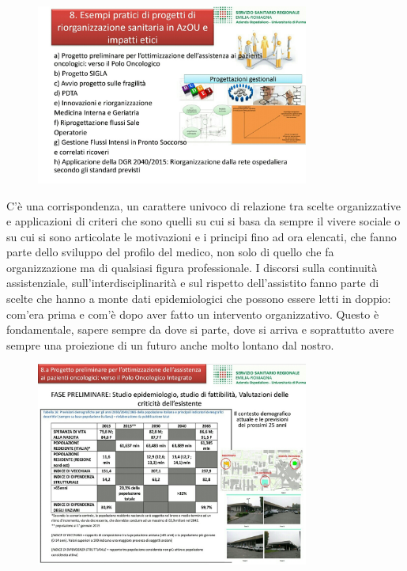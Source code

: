  \begin{figure}[!ht]
\centering
	\includegraphics[width=0.8\textwidth]{32/image23.jpeg}
	\end{figure}

C'è una corrispondenza, un carattere univoco di relazione tra scelte
organizzative e applicazioni di criteri che sono quelli su cui si basa
da sempre il vivere sociale o su cui si sono articolate le motivazioni e
i principi fino ad ora elencati, che fanno parte dello sviluppo del
profilo del medico, non solo di quello che fa organizzazione ma di
qualsiasi figura professionale. I discorsi sulla continuità
assistenziale, sull'interdisciplinarità e sul rispetto dell'assistito
fanno parte di scelte che hanno a monte dati epidemiologici che possono
essere letti in doppio: com'era prima e com'è dopo aver fatto un
intervento organizzativo. Questo è fondamentale, sapere sempre da dove
si parte, dove si arriva e soprattutto avere sempre una proiezione di un
futuro anche molto lontano dal nostro.

 \begin{figure}[!ht]
\centering
	\includegraphics[width=0.8\textwidth]{32/image24.jpeg}
	\end{figure}

